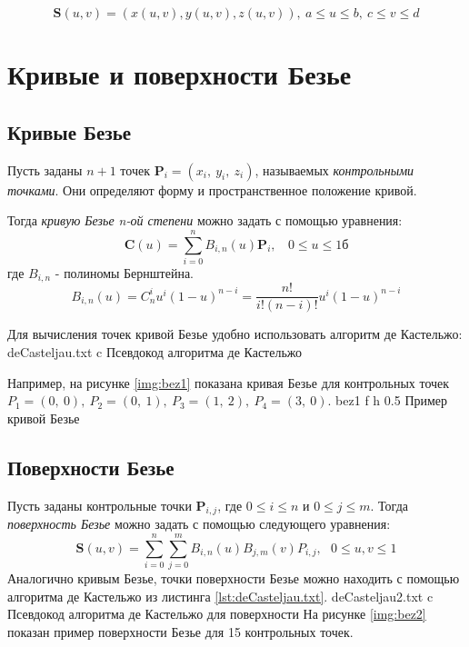 \documentclass{bmstu}
\begin{document}
\begin{equation}
    \mathbf{S}(u, v) = (x(u, v), y(u, v), z(u, v)),~        a \le u \le b,~c \le v \le d
\end{equation}

\section{Кривые и поверхности Безье}

\subsection{Кривые Безье}

Пусть заданы $n+1$ точек $\mathbf{P}_i = (x_i,~y_i,~z_i)$, называемых \textit{контрольными точками}. Они определяют форму и пространственное положение кривой.

Тогда \textit{кривую Безье n-ой степени} можно задать с помощью уравнения:
\begin{equation}
    \mathbf{C}(u) = \sum\limits_{i=0}^n B_{i, n}(u)\mathbf{P}_i,~~~~ 0\le u\le 1б
\end{equation}
где $B_{i, n}$ - полиномы Бернштейна.
\begin{equation}
    B_{i, n}(u) = C^i_nu^i(1-u)^{n-i} = \frac{n!}{i!(n-i)!}u^i(1-u)^{n-i}
\end{equation}

Для вычисления точек кривой Безье удобно использовать алгоритм де Кастельжо:
{deCasteljau.txt} %
{c} %
{Псевдокод алгоритма де Кастельжо} %

Например, на рисунке \ref{img:bez1} показана кривая Безье для контрольных точек $P_1 = (0,~0),~P_2=(0,~1),~P_3=(1,~2),~P_4=(3,~0)$.
{bez1} %
{f} %
{h} %
{0.5\textwidth} %
{Пример кривой Безье} %

\subsection{Поверхности Безье}

Пусть заданы контрольные точки $\mathbf{P}_{i,j}$, где $0 \le i \le n$ и $0 \le j \le m$.
Тогда \textit{поверхность Безье} можно задать с помощью следующего уравнения:
\begin{equation}
    \mathbf{S}(u,v)=\sum\limits_{i=0}^n\sum\limits_{j=0}^m B_{i,n}(u)B_{j,m}(v)P_{i,j},~~~ 0\le u,v\le 1
\end{equation}
Аналогично кривым Безье, точки поверхности Безье можно находить с помощью алгоритма де Кастельжо из листинга \ref{lst:deCasteljau.txt}.
{deCasteljau2.txt} %
{c} %
{Псевдокод алгоритма де Кастельжо для поверхности} %
На рисунке \ref{img:bez2} показан пример поверхности Безье для 15 контрольных точек.
\end{document}
